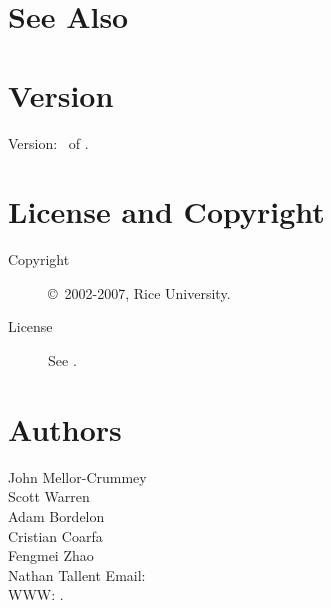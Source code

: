 \documentclass[english]{article}
\begin{document}
\section{See Also}


\section{Version}

Version: \Version\ of \Date.

\section{License and Copyright}

\begin{description}
\item[Copyright] \copyright\ 2002-2007, Rice University.
\item[License] See .
\end{description}

\section{Authors}

\noindent
John Mellor-Crummey \\
Scott Warren \\
Adam Bordelon \\
Cristian Coarfa \\
Fengmei Zhao \\
Nathan Tallent
Email:  \\
WWW: .

\LatexManEnd
\end{document}
